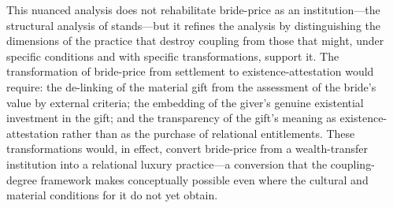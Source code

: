 This nuanced analysis does not rehabilitate bride-price as an institution---the structural analysis of  stands---but it refines the analysis by distinguishing the dimensions of the practice that destroy coupling from those that might, under specific conditions and with specific transformations, support it. The transformation of bride-price from settlement to existence-attestation would require: the de-linking of the material gift from the assessment of the bride's value by external criteria; the embedding of the giver's genuine existential investment in the gift; and the transparency of the gift's meaning as existence-attestation rather than as the purchase of relational entitlements. These transformations would, in effect, convert bride-price from a wealth-transfer institution into a relational luxury practice---a conversion that the coupling-degree framework makes conceptually possible even where the cultural and material conditions for it do not yet obtain.
